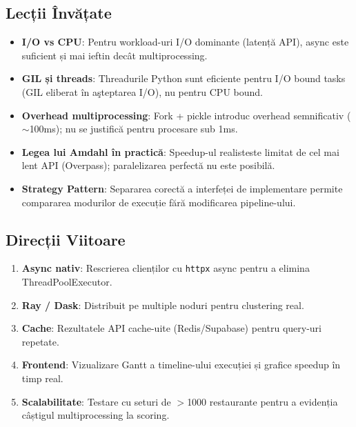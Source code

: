\documentclass[12pt,a4paper]{article}
\begin{document}
\subsection{Lecții Învățate}

\begin{itemize}[noitemsep]
  \item \textbf{I/O vs CPU}: Pentru workload-uri I/O dominante (latență API), async este suficient și mai ieftin decât multiprocessing.
  \item \textbf{GIL și threads}: Threadurile Python sunt eficiente pentru I/O bound tasks (GIL eliberat în aşteptarea I/O), nu pentru CPU bound.
  \item \textbf{Overhead multiprocessing}: Fork + pickle introduc overhead semnificativ ($\sim$100ms); nu se justifică pentru procesare sub 1ms.
  \item \textbf{Legea lui Amdahl în practică}: Speedup-ul realisteste limitat de cel mai lent API (Overpass); paralelizarea perfectă nu este posibilă.
  \item \textbf{Strategy Pattern}: Separarea corectă a interfeței de implementare permite compararea modurilor de execuție fără modificarea pipeline-ului.
\end{itemize}

\subsection{Direcții Viitoare}

\begin{enumerate}[noitemsep]
  \item \textbf{Async nativ}: Rescrierea clienților cu \texttt{httpx} async pentru a elimina ThreadPoolExecutor.
  \item \textbf{Ray / Dask}: Distribuit pe multiple noduri pentru clustering real.
  \item \textbf{Cache}: Rezultatele API cache-uite (Redis/Supabase) pentru query-uri repetate.
  \item \textbf{Frontend}: Vizualizare Gantt a timeline-ului execuției și grafice speedup în timp real.
  \item \textbf{Scalabilitate}: Testare cu seturi de $>$1000 restaurante pentru a evidenția câștigul multiprocessing la scoring.
\end{enumerate}
\end{document}
